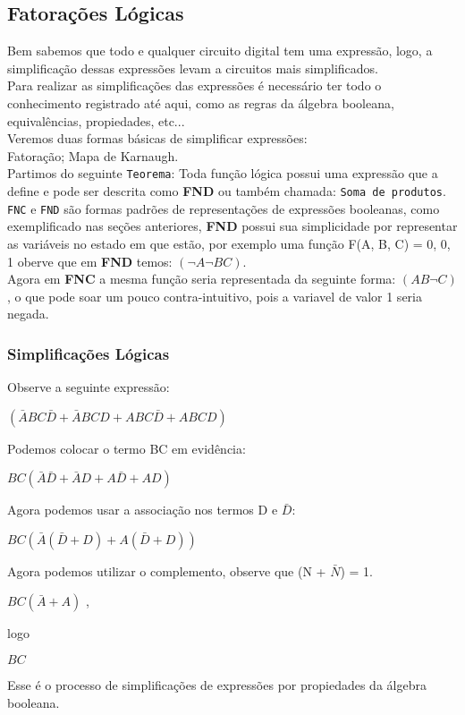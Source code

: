 \documentclass[12pt, onecolumn]{article}
\begin{document}
	\subsection{\centering Fatorações Lógicas}
	
	Bem sabemos que todo e qualquer circuito digital tem uma expressão, logo, 
	a simplificação dessas expressões levam a circuitos mais simplificados. \\
	\newline
	Para realizar as simplificações das expressões é necessário ter todo o
	conhecimento registrado até aqui, como as regras da álgebra booleana, 
	equivalências, propiedades, etc... \\
	\newline
	Veremos duas formas básicas de simplificar expressões: \\	
		Fatoração;
		Mapa de Karnaugh. \\
	\newline	
	Partimos do seguinte \texttt{Teorema}: Toda função lógica possui uma expressão
	que a define e pode ser descrita como \textbf{FND} ou também chamada: 
	\texttt{Soma de produtos}. \\
	\newline
	\texttt{FNC} e \texttt{FND} são formas padrões de representações de expressões
	booleanas, como exemplificado nas seções anteriores, \textbf{FND} possui
	sua simplicidade por representar as variáveis no estado em que estão, 
	por exemplo uma função F(A, B, C) = 0, 0, 1 oberve que	em \textbf{FND} 
	temos:	$(\lnot{A} \lnot{B} C)$. \\
	\newline
	Agora em \textbf{FNC} a mesma função seria representada	da seguinte 
	forma: $(A B \lnot{C})$, o que pode soar um pouco contra-intuitivo,
	pois a variavel de valor 1 seria negada.
		
	\subsubsection{\centering Simplificações Lógicas}
	
	Observe a seguinte expressão: 
	\begin{center} 
		$(\bar{A} B C\bar{D} + \bar{A} B C D + A B C\bar{D} + A B C D)$  	
	\end{center}
	Podemos colocar o termo BC em evidência:
	\begin{center} 
		$BC(\bar{A}\bar{D} + \bar{A}D + A\bar{D} + AD)$
	\end{center}
	Agora podemos usar a associação nos termos D e $\bar{D}$: 
	\begin{center} 
		$BC(\bar{A}(\bar{D}  + D) + A(\bar{D} + D))$
	\end{center}
	Agora podemos utilizar o complemento, observe que (N + $\bar{N}$) = 1. \\
	\begin{center} 
		$BC(\bar{A} + A)$ ,  
	\end{center}
	logo \\
	\begin{center} 
		$BC$
	\end{center}
	Esse é o processo de simplificações de expressões por propiedades da álgebra 
	booleana. 
\end{document}
